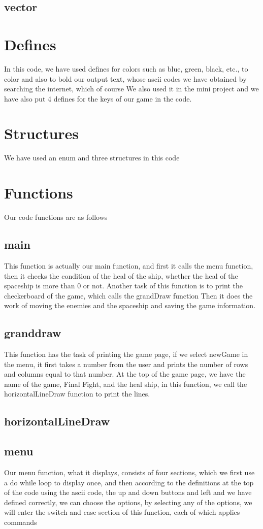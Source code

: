 \documentclass[12pt,a4paper]{article}
\begin{document}
	\subsection{vector}
	

	\section{Defines}\label{description.defines}
	In this code, we have used defines for colors such as blue, green, black, etc., to color and also to bold our output text, whose ascii codes we have obtained by searching the internet, which of course We also used it in the mini project and we have also put 4 defines for the keys of our game in the code.
	\section{Structures}\label{description.structs}
	We have used an enum and three structures in this code
	\section{Functions}\label{description.func}
	Our code functions are as follows
	\subsection{main}
	This function is actually our main function, and first it calls the menu function, then it checks the condition of the heal of the ship, whether the heal of the spaceship is more than 0 or not.
Another task of this function is to print the checkerboard of the game, which calls the grandDraw function
Then it does the work of moving the enemies and the spaceship and saving the game information.
	
	\subsection{granddraw}
	This function has the task of printing the game page, if we select newGame in the menu, it first takes a number from the user and prints the number of rows and columns equal to that number.
At the top of the game page, we have the name of the game, Final Fight, and the heal ship, in this function, we call the horizontalLineDraw function to print the lines.
	\subsection{horizontalLineDraw}
	\subsection{menu}
	Our menu function, what it displays, consists of four sections, which we first use a do while loop to display once, and then according to the definitions at the top of the code using the ascii code, the up and down buttons and left
	and we have defined correctly, we can choose the options, by selecting any of the options, we will enter the switch and case section of this function, each of which applies commands
	
\end{document}
